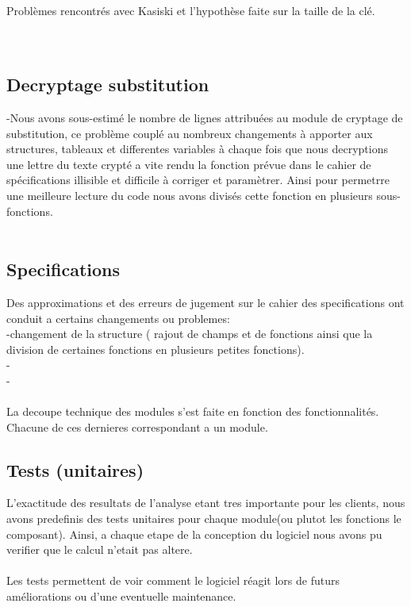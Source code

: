 \documentclass[a4]{article}
\begin{document}
 		Problèmes rencontrés avec Kasiski et l'hypothèse faite sur la taille de la clé. \\
  		 \\ \\
	
	\subsection{Decryptage substitution}
	-Nous avons sous-estimé le nombre de lignes attribuées au module de cryptage de substitution,
	 ce problème couplé au nombreux changements à apporter aux structures, tableaux et differentes
	  variables à chaque fois que nous decryptions une lettre du texte crypté a vite rendu la fonction
	   prévue dans le cahier de spécifications illisible et difficile à corriger et paramètrer. Ainsi 
	   pour permetrre une meilleure lecture du code nous avons divisés cette fonction en plusieurs sous-fonctions. \\ \\

	
		
		\subsection{Specifications}
		Des approximations et des erreurs de jugement sur le cahier des specifications ont conduit a certains changements ou problemes:\\
		-changement de la structure ( rajout de champs et de fonctions ainsi que la division de certaines fonctions en plusieurs
		 petites fonctions).\\
		-\\
		-\\ \\
		
		
		
		

		La decoupe technique des modules s'est faite en fonction des fonctionnalités.
		 Chacune de ces dernieres correspondant a un module.
		
		\subsection{Tests (unitaires)}
		L’exactitude des resultats de l'analyse etant tres importante pour les clients, nous avons predefinis des tests
unitaires pour chaque module(ou plutot les fonctions le composant). Ainsi, a chaque etape de la conception du logiciel
nous avons pu verifier que le calcul n’etait pas altere. \\ \\
Les tests permettent de voir comment le logiciel réagit lors de futurs améliorations ou d'une eventuelle maintenance. \\ 
 
\end{document}
